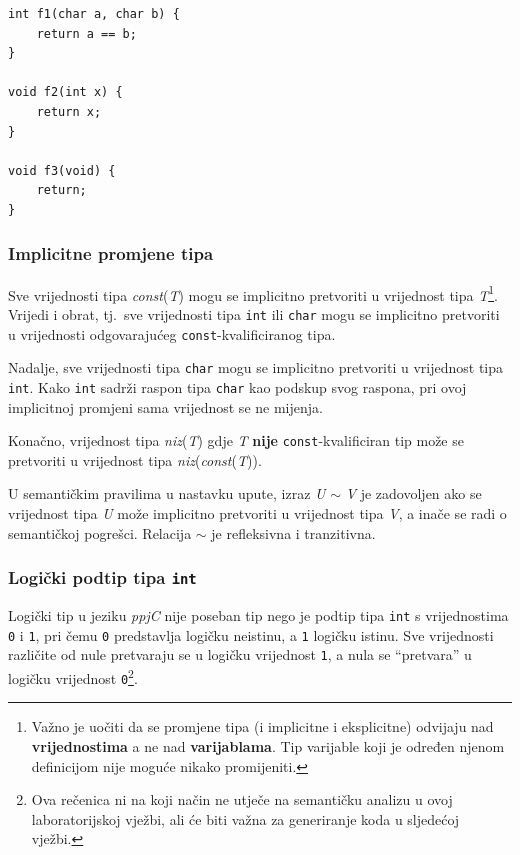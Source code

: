 \documentclass[times, 12pt, utf8]{book}
\begin{document}
\begin{lstlisting}[caption={Primjer jednostavne funkcije.},label=lst:primjer_tip_funkcije]
int f1(char a, char b) {
    return a == b;
}

void f2(int x) {
    return x;
}

void f3(void) {
    return;
}
\end{lstlisting}

\subsubsection{Implicitne promjene tipa}
Sve vrijednosti tipa \emph{const}(\emph{T}) mogu se implicitno pretvoriti u vrijednost tipa \emph{T}\footnote{Važno je uočiti da se promjene tipa (i implicitne i eksplicitne) odvijaju nad \textbf{vrijednostima} a ne nad \textbf{varijablama}. Tip varijable koji je određen njenom definicijom nije moguće nikako promijeniti.}.
Vrijedi i obrat, tj.~sve vrijednosti tipa \verb|int| ili \verb|char| mogu se implicitno pretvoriti u vrijednosti odgovarajućeg \verb|const|-kvalificiranog tipa.

Nadalje, sve vrijednosti tipa \verb|char| mogu se implicitno pretvoriti u vrijednost tipa \verb|int|.
Kako \verb|int| sadrži raspon tipa \verb|char| kao podskup svog raspona, pri ovoj implicitnoj promjeni sama vrijednost se ne mijenja.

Konačno, vrijednost tipa \emph{niz}(\emph{T}) gdje \emph{T} \textbf{nije} \verb|const|-kvalificiran tip može se pretvoriti u vrijednost tipa \emph{niz}(\emph{const}(\emph{T})).

U semantičkim pravilima u nastavku upute, izraz \emph{U} \(\sim\) \emph{V} je zadovoljen ako se vrijednost tipa \emph{U} može implicitno pretvoriti u vrijednost tipa \emph{V}, a inače se radi o semantičkoj pogrešci.
Relacija \(\sim\) je refleksivna i tranzitivna.

\subsubsection{Logički podtip tipa \texttt{int}}
Logički tip u jeziku \emph{ppjC} nije poseban tip nego je podtip tipa \verb|int| s vrijednostima \verb|0| i \verb|1|, pri čemu \verb|0| predstavlja logičku neistinu, a \verb|1| logičku istinu.
Sve vrijednosti različite od nule pretvaraju se u logičku vrijednost \verb|1|, a nula se ``pretvara'' u logičku vrijednost \verb|0|\footnote{Ova rečenica ni na koji način ne utječe na semantičku analizu u ovoj laboratorijskoj vježbi, ali će biti važna za generiranje koda u sljedećoj vježbi.}.
\end{document}
